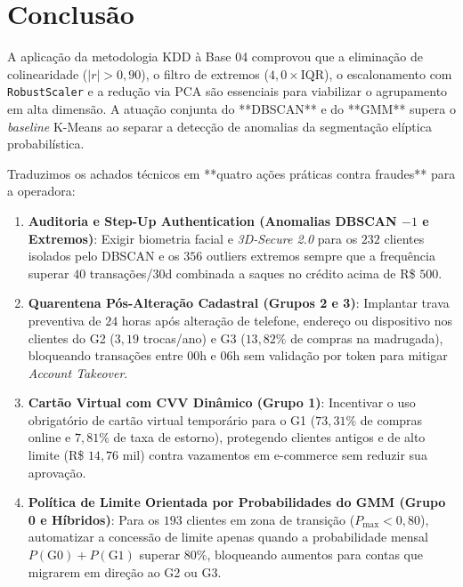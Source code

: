 \documentclass[10pt,twocolumn]{article}
\begin{document}
\section{Conclusão}

A aplicação da metodologia KDD à Base 04 comprovou que a eliminação de colinearidade ($|r| > 0,90$), o filtro de extremos ($4,0 \times \text{IQR}$), o escalonamento com \texttt{RobustScaler} e a redução via PCA são essenciais para viabilizar o agrupamento em alta dimensão. A atuação conjunta do **DBSCAN** e do **GMM** supera o \textit{baseline} K-Means ao separar a detecção de anomalias da segmentação elíptica probabilística.

Traduzimos os achados técnicos em **quatro ações práticas contra fraudes** para a operadora:
\begin{enumerate}
  \item \textbf{Auditoria e Step-Up Authentication (Anomalias DBSCAN $-1$ e Extremos)}: Exigir biometria facial e \textit{3D-Secure 2.0} para os $232$ clientes isolados pelo DBSCAN e os $356$ outliers extremos sempre que a frequência superar $40$ transações/30d combinada a saques no crédito acima de R\$ $500$.
  \item \textbf{Quarentena Pós-Alteração Cadastral (Grupos 2 e 3)}: Implantar trava preventiva de $24$ horas após alteração de telefone, endereço ou dispositivo nos clientes do G2 ($3,19$ trocas/ano) e G3 ($13,82\%$ de compras na madrugada), bloqueando transações entre $00\text{h}$ e $06\text{h}$ sem validação por token para mitigar \textit{Account Takeover}.
  \item \textbf{Cartão Virtual com CVV Dinâmico (Grupo 1)}: Incentivar o uso obrigatório de cartão virtual temporário para o G1 ($73,31\%$ de compras online e $7,81\%$ de taxa de estorno), protegendo clientes antigos e de alto limite (R\$ $14,76$ mil) contra vazamentos em e-commerce sem reduzir sua aprovação.
  \item \textbf{Política de Limite Orientada por Probabilidades do GMM (Grupo 0 e Híbridos)}: Para os $193$ clientes em zona de transição ($P_{\max} < 0,80$), automatizar a concessão de limite apenas quando a probabilidade mensal $P(\text{G0}) + P(\text{G1})$ superar $80\%$, bloqueando aumentos para contas que migrarem em direção ao G2 ou G3.
\end{enumerate}
\end{document}
